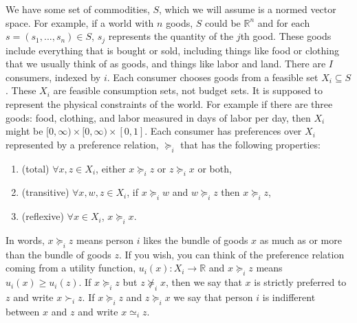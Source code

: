 \documentclass[12pt,reqno]{amsart}
\theoremstyle{definition}
\def\R{\mathbb{R}}
\newcommand{\prefeq}{\succeq}
\newcommand{\pref}{\succ}
\begin{document}
We have some set of commodities, $S$, which we will assume is a normed
vector space. For example, if a world with $n$ goods, $S$ could be
$\R^n$ and for each $s = (s_1,...,s_n) \in S$, $s_j$ represents the
quantity of the $j$th good. These goods include everything that is
bought or sold, including things like food or clothing that we usually
think of as goods, and things like labor and land. There are $I$
consumers, indexed by $i$. Each consumer chooses goods from a feasible
set $X_i \subseteq S$. These $X_i$ are feasible consumption sets, not
budget sets. It is supposed to represent the physical constraints of
the world. For example if there are three goods: food, clothing, and labor
measured in days of labor per day, then $X_i$ might be $[0, \infty)
\times [0,\infty) \times [0, 1]$.  Each consumer has preferences over
$X_i$ represented by a preference relation, $\prefeq_i$ that has the
following properties:
\begin{enumerate}
\item (total) $\forall x, z \in X_i$, either $x \prefeq_i z$ or $z
  \prefeq_i x$ or both,
\item (transitive) $\forall x, w, z \in X_i$, if $x \prefeq_i w$ and $w
  \prefeq_i z$ then $x \prefeq_i z$,
\item (reflexive) $\forall x \in X_i$, $x \prefeq_i x$.
\end{enumerate}
In words, $x \prefeq_i z$ means person $i$ likes the bundle of goods $x$
as much as or more than the bundle of goods $z$. If you wish, you can
think of the preference relation coming from a utility function,
$u_i(x) : X_i \rightarrow \R$ and $x \prefeq_i z$ means $u_i(x) \geq
u_i(z)$.  If $x \prefeq_i z$ but $z \not\prefeq_i x$, then we say that
$x$ is strictly preferred to $z$ and write $x \pref_i z$. If $x
\prefeq_i z$ and $z \prefeq_i x$ we say that person $i$ is indifferent
between $x$ and $z$ and write $x \simeq_i z$.
\end{document}
